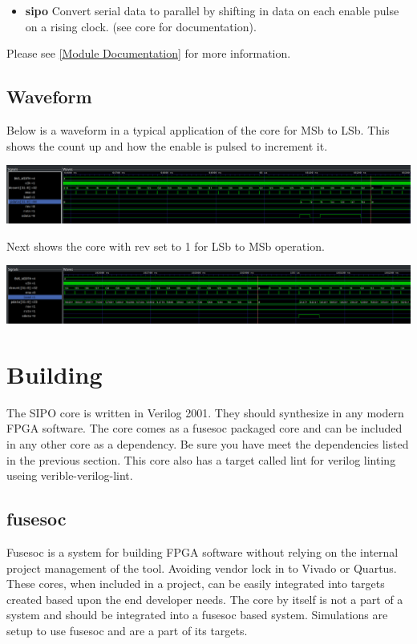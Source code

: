 \begin{itemize}
  \item \textbf{sipo} Convert serial data to parallel by shifting in data on each enable pulse on a rising clock. (see core for documentation).
\end{itemize}

Please see \ref{Module Documentation} for more information.

\subsection{Waveform}
\par
Below is a waveform in a typical application of the core for MSb to LSb. This shows the count up and how the enable is pulsed to increment it.

\includegraphics[width=\textwidth]{img/diagrams/waveform_rev0.png}

\par
Next shows the core with rev set to 1 for LSb to MSb operation.

\includegraphics[width=\textwidth]{img/diagrams/waveform_rev1.png}


\section{Building}

\par
The SIPO core is written in Verilog 2001. They should synthesize in any modern FPGA software. The core comes as a fusesoc packaged core and can be included in any other core as a dependency. Be sure you have meet the dependencies listed in the previous section. This core also has a target called lint for verilog linting useing verible-verilog-lint.

\subsection{fusesoc}
\par
Fusesoc is a system for building FPGA software without relying on the internal project management of the tool. Avoiding vendor lock in to Vivado or Quartus.
These cores, when included in a project, can be easily integrated into targets created based upon the end developer needs. The core by itself is not a part of
a system and should be integrated into a fusesoc based system. Simulations are setup to use fusesoc and are a part of its targets.

